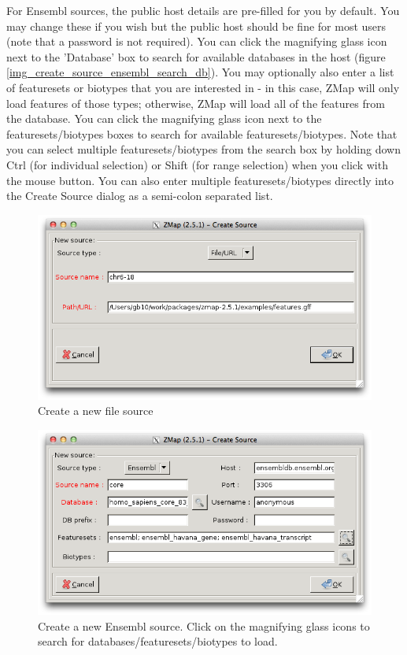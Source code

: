 \documentclass[letterpaper]{article}
\begin{document}
For Ensembl sources, the public host details are pre-filled for you by default. You may change these if you wish but the public host should be fine for most users (note that a password is not required). You can click the magnifying glass icon next to the 'Database' box to search for available databases in the host (figure \ref{img_create_source_ensembl_search_db}). You may optionally also enter a list of featuresets or biotypes that you are interested in - in this case, ZMap will only load features of those types; otherwise, ZMap will load all of the features from the database. You can click the magnifying glass icon next to the featuresets/biotypes boxes to search for available featuresets/biotypes. Note that you can select multiple featuresets/biotypes from the search box by holding down Ctrl (for individual selection) or Shift (for range selection) when you click with the mouse button. You can also enter multiple featuresets/biotypes directly into the Create Source dialog as a semi-colon separated list.

\begin{figure}
\centering
\color[rgb]{0.30980393,0.5058824,0.7411765}
\includegraphics[resolution=150]{img_create_source_file.png}
\caption{Create a new file source}
\label{img_create_source_file}
\end{figure}

\begin{figure}
\centering
\color[rgb]{0.30980393,0.5058824,0.7411765}
\includegraphics[resolution=150]{img_create_source_ensembl.png}
\caption{Create a new Ensembl source. Click on the magnifying glass icons to search for databases/featuresets/biotypes to load.}
\label{img_create_source_ensembl}
\end{figure}
\end{document}
